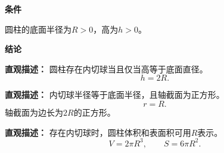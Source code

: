 \begin{statementbox}
	\textbf{\textcolor{CStatement}{条件}}
	\begin{description}[style=nextline, leftmargin=2.8em, labelsep=0.5em, itemsep=0.35em]
		\item[\textbf{\textcolor{CStatement}{条件1（圆柱参数）：}}]
			圆柱的底面半径为$R>0$，高为$h>0$。
	\end{description}
	\textbf{\textcolor{CStatement}{结论}}
	\begin{description}[style=nextline, leftmargin=2.8em, labelsep=0.5em, itemsep=0.45em]
		\item[\textbf{\textcolor{CStatement}{结论一（充要条件）：}}]
			\textbf{\textcolor{CStatement}{直观描述：}}
			圆柱存在内切球当且仅当高等于底面直径。
			\[
				h = 2R.
			\]
		\item[\textbf{\textcolor{CStatement}{结论二（几何性质）：}}]
			\textbf{\textcolor{CStatement}{直观描述：}}
			内切球半径等于底面半径，且轴截面为正方形。
			\[
				r = R.
			\]
			轴截面为边长为$2R$的正方形。
		\item[\textbf{\textcolor{CStatement}{推广结论（常见公式）：}}]
			\textbf{\textcolor{CStatement}{直观描述：}}
			存在内切球时，圆柱体积和表面积可用$R$表示。
			\[
				V = 2\pi R^{3},
				\qquad
				S = 6\pi R^{2}.
			\]
	\end{description}

\end{statementbox}

